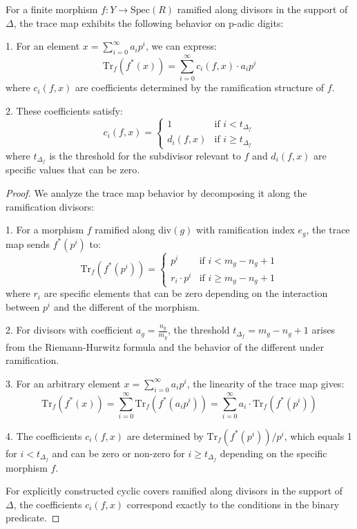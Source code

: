 \begin{proposition}\label{prop:trace-map-digits}
For a finite morphism $f: Y \to \text{Spec}(R)$ ramified along divisors in the support of $\Delta$, the trace map exhibits the following behavior on p-adic digits:

1. For an element $x = \sum_{i=0}^{\infty} a_i p^i$, we can express:
   $$\text{Tr}_f(f^*(x)) = \sum_{i=0}^{\infty} c_i(f,x) \cdot a_i p^i$$
   where $c_i(f,x)$ are coefficients determined by the ramification structure of $f$.

2. These coefficients satisfy:
   $$c_i(f,x) = \begin{cases}
   1 & \text{if } i < t_{\Delta_f} \\
   d_i(f,x) & \text{if } i \geq t_{\Delta_f}
   \end{cases}$$
   where $t_{\Delta_f}$ is the threshold for the subdivisor relevant to $f$ and $d_i(f,x)$ are specific values that can be zero.
\end{proposition}

\begin{proof}
We analyze the trace map behavior by decomposing it along the ramification divisors:

1. For a morphism $f$ ramified along $\text{div}(g)$ with ramification index $e_g$, the trace map sends $f^*(p^i)$ to:
   $$\text{Tr}_f(f^*(p^i)) = \begin{cases}
   p^i & \text{if } i < m_g - n_g + 1 \\
   r_i \cdot p^i & \text{if } i \geq m_g - n_g + 1
   \end{cases}$$
   where $r_i$ are specific elements that can be zero depending on the interaction between $p^i$ and the different of the morphism.

2. For divisors with coefficient $a_g = \frac{n_g}{m_g}$, the threshold $t_{\Delta_f} = m_g - n_g + 1$ arises from the Riemann-Hurwitz formula and the behavior of the different under ramification.

3. For an arbitrary element $x = \sum_{i=0}^{\infty} a_i p^i$, the linearity of the trace map gives:
   $$\text{Tr}_f(f^*(x)) = \sum_{i=0}^{\infty} \text{Tr}_f(f^*(a_i p^i)) = \sum_{i=0}^{\infty} a_i \cdot \text{Tr}_f(f^*(p^i))$$

4. The coefficients $c_i(f,x)$ are determined by $\text{Tr}_f(f^*(p^i))/p^i$, which equals 1 for $i < t_{\Delta_f}$ and can be zero or non-zero for $i \geq t_{\Delta_f}$ depending on the specific morphism $f$.

For explicitly constructed cyclic covers ramified along divisors in the support of $\Delta$, the coefficients $c_i(f,x)$ correspond exactly to the conditions in the binary predicate.
\end{proof}

